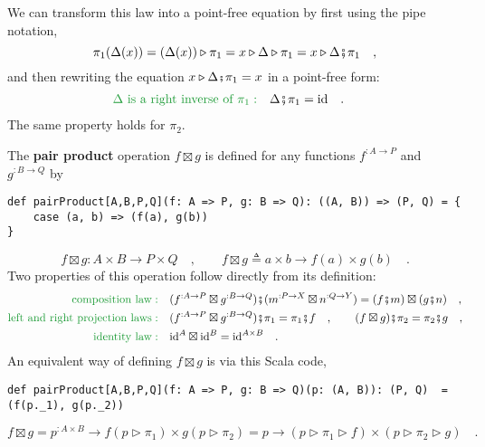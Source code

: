 We can transform this law into a point-free equation by first using
the pipe notation,
\[
\pi_{1}(\Delta(x))=(\Delta(x))\triangleright\pi_{1}=x\triangleright\Delta\triangleright\pi_{1}=x\triangleright\Delta\bef\pi_{1}\quad,
\]
and then rewriting the equation $x\triangleright\Delta\bef\pi_{1}=x$
in a point-free form: 
\begin{align}
{\color{greenunder}\Delta\text{ is a right inverse of }\pi_{1}:}\quad & \Delta\bef\pi_{1}=\text{id}\quad.\label{eq:pair-identity-law-left}
\end{align}
The same property holds for $\pi_{2}$.

The \textbf{pair product} operation
$f\boxtimes g$ is defined for any functions $f^{:A\rightarrow P}$
and $g^{:B\rightarrow Q}$ by
\begin{lstlisting}
def pairProduct[A,B,P,Q](f: A => P, g: B => Q): ((A, B)) => (P, Q) = {
    case (a, b) => (f(a), g(b))
}
\end{lstlisting}
\[
f\boxtimes g:A\times B\rightarrow P\times Q\quad,\quad\quad f\boxtimes g\triangleq a\times b\rightarrow f(a)\times g(b)\quad.
\]
Two properties of this operation follow directly from its definition:
\begin{align}
{\color{greenunder}\text{composition law}:}\quad & (f^{:A\rightarrow P}\boxtimes g^{:B\rightarrow Q})\bef(m^{:P\rightarrow X}\boxtimes n^{:Q\rightarrow Y})=(f\bef m)\boxtimes(g\bef n)\quad,\label{eq:pair-product-composition-law}\\
{\color{greenunder}\text{left and right projection laws}:}\quad & (f^{:A\rightarrow P}\boxtimes g^{:B\rightarrow Q})\bef\pi_{1}=\pi_{1}\bef f\quad,\quad\quad(f\boxtimes g)\bef\pi_{2}=\pi_{2}\bef g\quad,\label{eq:pair-product-projection-laws}\\
{\color{greenunder}\text{identity law}:}\quad & \text{id}^{A}\boxtimes\text{id}^{B}=\text{id}^{A\times B}\quad.\nonumber 
\end{align}
An equivalent way of defining $f\boxtimes g$ is via this Scala code,
\begin{lstlisting}
def pairProduct[A,B,P,Q](f: A => P, g: B => Q)(p: (A, B)): (P, Q)  =  (f(p._1), g(p._2))
\end{lstlisting}
\[
f\boxtimes g=p^{:A\times B}\rightarrow f(p\triangleright\pi_{1})\times g(p\triangleright\pi_{2})=p\rightarrow(p\triangleright\pi_{1}\triangleright f)\times(p\triangleright\pi_{2}\triangleright g)\quad.
\]

